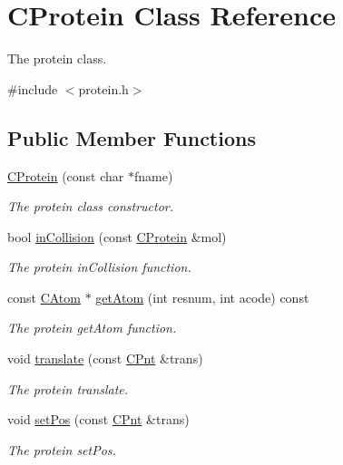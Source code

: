 \hypertarget{classCProtein}{\section{C\-Protein Class Reference}
\label{classCProtein}
}


The protein class.  




{\ttfamily \#include $<$protein.\-h$>$}

\subsection*{Public Member Functions}
\begin{DoxyCompactItemize}
\item 
\hyperlink{classCProtein_add7b99ce966900c95f6a0b5ce1d644ac}{C\-Protein} (const char $\ast$fname)
\begin{DoxyCompactList}\small\item\em The protein class constructor. \end{DoxyCompactList}\item 
bool \hyperlink{classCProtein_afb3fe3188e1a61488295b4fcdb3664e6}{in\-Collision} (const \hyperlink{classCProtein}{C\-Protein} \&mol)
\begin{DoxyCompactList}\small\item\em The protein in\-Collision function. \end{DoxyCompactList}\item 
const \hyperlink{classCAtom}{C\-Atom} $\ast$ \hyperlink{classCProtein_a61914554b1b927e7f2bfa4c12c78ba0a}{get\-Atom} (int resnum, int acode) const 
\begin{DoxyCompactList}\small\item\em The protein get\-Atom function. \end{DoxyCompactList}\item 
void \hyperlink{classCProtein_a7d82de84256c6e9b5868b8fe08df6e15}{translate} (const \hyperlink{classCPnt}{C\-Pnt} \&trans)
\begin{DoxyCompactList}\small\item\em The protein translate. \end{DoxyCompactList}\item 
void \hyperlink{classCProtein_a890bc62459bae1a93b67e90cdcef18eb}{set\-Pos} (const \hyperlink{classCPnt}{C\-Pnt} \&trans)
\begin{DoxyCompactList}\small\item\em The protein set\-Pos. \end{DoxyCompactList}\item 

\end{DoxyCompactItemize}
